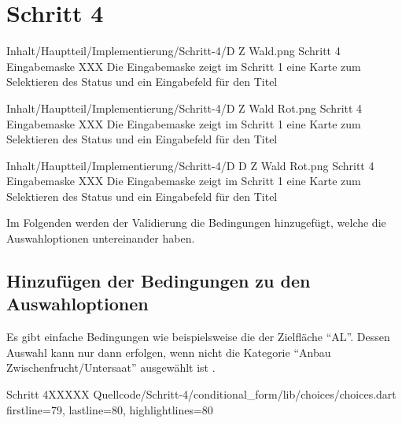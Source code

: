 \chapter{Schritt 4}
\label{chap:Schritt-4}


\begin{alexfigure}{Inhalt/Hauptteil/Implementierung/Schritt-4/D Z Wald.png}
  {Schritt 4 Eingabemaske}
  {XXX Die Eingabemaske zeigt im Schritt 1 eine Karte zum Selektieren des Status und ein Eingabefeld für den Titel}

  \label{fig:Schritt4Eingabemaske}

\end{alexfigure}

\begin{alexfigure}{Inhalt/Hauptteil/Implementierung/Schritt-4/D Z Wald Rot.png}
  {Schritt 4 Eingabemaske}
  {XXX Die Eingabemaske zeigt im Schritt 1 eine Karte zum Selektieren des Status und ein Eingabefeld für den Titel}

  \label{fig:Schritt4Eingabemaske}

\end{alexfigure}


\begin{alexfigure}{Inhalt/Hauptteil/Implementierung/Schritt-4/D D Z Wald Rot.png}
  {Schritt 4 Eingabemaske}
  {XXX Die Eingabemaske zeigt im Schritt 1 eine Karte zum Selektieren des Status und ein Eingabefeld für den Titel}

  \label{fig:Schritt4Eingabemaske}

\end{alexfigure}


Im Folgenden werden der Validierung die Bedingungen hinzugefügt,
welche die Auswahloptionen untereinander haben. 

\section{Hinzufügen der Bedingungen zu den Auswahloptionen}

Es gibt einfache Bedingungen wie beispielsweise die der Zielfläche \enquote{AL}.
Dessen Auswahl kann nur dann erfolgen,
wenn nicht die Kategorie \enquote{Anbau Zwischenfrucht/Untersaat} ausgewählt ist \Lst{\ref{lst:Schritt4al}}.

\begin{alexlisting}{Schritt 4}{XXXXX}
  {Quellcode/Schritt-4/conditional_form/lib/choices/choices.dart}
  {firstline=79, lastline=80, highlightlines={80}}
  \label{lst:Schritt4al}
\end{alexlisting}

